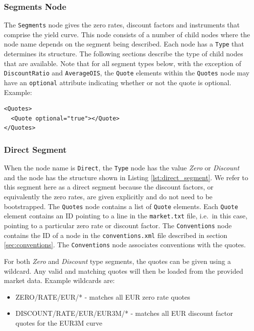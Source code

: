 \subsubsection*{Segments Node} \label{ss:segments_node}
The \lstinline!Segments! node gives the zero rates, discount factors and instruments that comprise the yield curve. This
node consists of a number of child nodes where the node name depends on the segment being described. Each node has a
\lstinline!Type! that determines its structure. The following sections describe the type of child nodes that are
available. Note that for all segment types below, with the exception of \lstinline!DiscountRatio! and \lstinline!AverageOIS!, the
\lstinline!Quote! elements within the \lstinline!Quotes! node may have an \lstinline!optional! attribute indicating whether or
not the quote is optional. Example:
\begin{verbatim}
<Quotes>
  <Quote optional="true"></Quote>
</Quotes>
\end{verbatim}

\subsubsection*{Direct Segment}
When the node name is \lstinline!Direct!, the \lstinline!Type! node has the value \emph{Zero} or \emph{Discount} and the
node has the structure shown in Listing \ref{lst:direct_segment}. We refer to this segment here as a direct segment
because the discount factors, or equivalently the zero rates, are given explicitly and do not need to be
bootstrapped. The \lstinline!Quotes! node contains a list of \lstinline!Quote! elements. Each \lstinline!Quote! element
contains an ID pointing to a line in the {\tt market.txt} file, i.e.\ in this case, pointing to a particular zero rate
or discount factor. The \lstinline!Conventions! node contains the ID of a node in the {\tt conventions.xml} file
described in section \ref{sec:conventions}. The \lstinline!Conventions! node associates conventions with the quotes.

For both \emph{Zero} and \emph{Discount} type segments, the quotes can be given using a wildcard. Any valid and matching quotes will then be loaded from the provided market data. Example wildcards are:
\begin{itemize}
  \item {ZERO/RATE/EUR/*} - matches all EUR zero rate quotes
  \item {DISCOUNT/RATE/EUR/EUR3M/*} - matches all EUR discount factor quotes for the EUR3M curve
\end{itemize}

